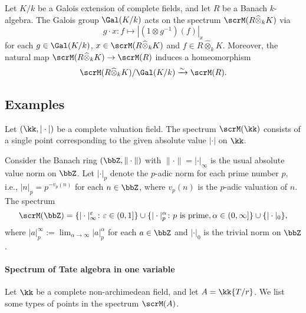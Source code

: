     \begin{proposition}\label{prop:the_Galois_action_on_the_spectrum_of_banach_rings}
        Let \(K/k\) be a Galois extension of complete fields, and let \(R\) be a Banach \(k\)-algebra.
        The Galois group \(\Gal(K/k)\) acts on the spectrum \(\scrM(R \widehat{\otimes}_k K)\) via
        \[
            g \cdot x: f \mapsto |(1 \otimes g^{-1})(f)|_x
        \]
        for each \(g \in \Gal(K/k)\), \(x \in \scrM(R \widehat{\otimes}_k K)\) and \(f \in R \widehat{\otimes}_k K\).
        Moreover, the natural map \(\scrM(R \widehat{\otimes}_k K) \to \scrM(R)\) induces a homeomorphism
        \[
            \scrM(R \widehat{\otimes}_k K) / \Gal(K/k) \xrightarrow{\sim} \scrM(R).
        \]
    \end{proposition}


\subsection{Examples}

    \begin{example}\label{eg:spectrum_of_valuation_field}
        Let \((\kk, |\cdot|)\) be a complete valuation field.
        The spectrum \(\scrM(\kk)\) consists of a single point corresponding to the given absolute value \(|\cdot|\) on \(\kk\).
    \end{example}

    \begin{example}\label{eg:spectrum_of_Z_with_absolute_value_norm}
        Consider the Banach ring \((\bbZ, \|\cdot\|)\) with \(\|\cdot\| = |\cdot|_\infty\) is the usual absolute value norm on \(\bbZ\).
        Let \(|\cdot|_p\) denote the \(p\)-adic norm for each prime number \(p\), i.e., \(|n|_p = p^{-v_p(n)}\) for each \(n \in \bbZ\), where \(v_p(n)\) is the \(p\)-adic valuation of \(n\).
        The spectrum 
        \[ \scrM(\bbZ) = \{|\cdot|_{\infty}^\varepsilon \colon \varepsilon \in (0,1]\} \cup \{| \cdot |_p^\alpha \colon p \text{ is prime}, \alpha \in (0,\infty] \} \cup \{|\cdot|_0\}, \]
        where \(|a|_p^\infty := \lim_{\alpha \to \infty} |a|_p^\alpha\) for each \(a \in \bbZ\) and \(|\cdot|_0\) is the trivial norm on \(\bbZ\).
    \end{example}

    \paragraph{Spectrum of Tate algebra in one variable} Let \(\kk\) be a complete non-archimedean field, and let \(A = \kk\{T/r\}\).
    We list some types of points in the spectrum \(\scrM(A)\).


